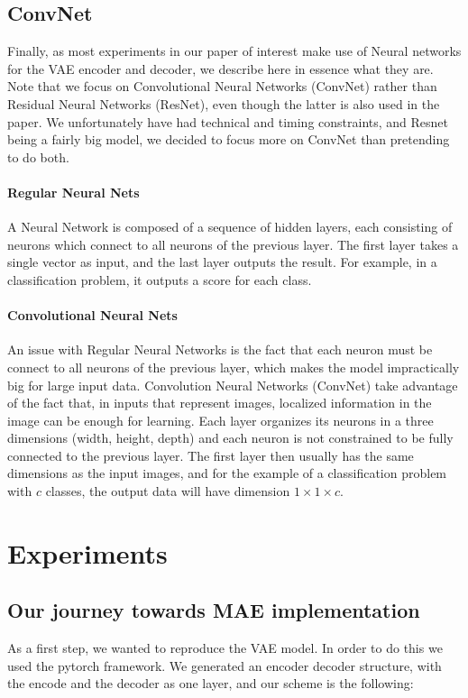 \documentclass{article} %
\begin{document}
\subsection {ConvNet}
Finally, as most experiments in our paper of interest make use of Neural networks
for the VAE encoder and decoder, we describe here in essence what they are. Note
that we focus on Convolutional Neural Networks (ConvNet) rather than Residual
Neural Networks (ResNet), even though the latter is also used in the paper. We
unfortunately have had technical and timing constraints, and Resnet being
a fairly big model, we decided to focus more on ConvNet than pretending to do both.

\paragraph {Regular Neural Nets} A Neural Network is composed of a sequence of
hidden layers, each consisting of neurons which connect to all neurons of the
previous layer. The first layer takes a single vector as input, and the last
layer outputs the result. For example, in a classification problem, it outputs a
score for each class.

\paragraph {Convolutional Neural Nets}
An issue with Regular Neural Networks is the fact that each neuron must be
connect to all neurons of the previous layer, which makes the model
impractically big for large input data. Convolution Neural Networks (ConvNet)
take advantage of the fact that, in inputs that represent images, localized
information in the image can be enough for learning. Each layer organizes its
neurons in a three dimensions (width, height, depth) and each neuron is not
constrained to be fully connected to the previous layer. The first layer then
usually has the same dimensions as the input images, and for the example of a
classification problem with $c$ classes, the output data will have dimension
$1\times 1\times c$.

\section{Experiments}
\subsection{Our journey towards MAE implementation}
As a first step, we wanted to reproduce the VAE model. In order to do this we
used the pytorch framework. We generated an encoder decoder structure, with the
encode and the decoder as one layer, and our scheme is the following:
\end{document}
